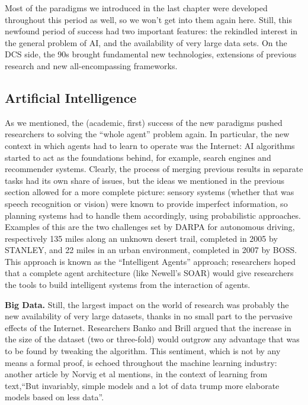 \documentclass[../main.tex]{subfiles}
\begin{document}
Most of the paradigms we introduced in the last chapter were developed throughout this period as well, so we won't get into them again here. Still, this newfound period of success had two important features: the rekindled interest in the general problem of AI, and the availability of very large data sets. On the DCS side, the 90s brought fundamental new technologies, extensions of previous research and new all-encompassing frameworks.

\subsection{Artificial Intelligence}
As we mentioned, the (academic, first) success of the new paradigms pushed researchers to solving the ``whole agent'' problem again. In particular, the new context in which agents had to learn to operate was the Internet: AI algorithms started to act as the foundations behind, for example, search engines and recommender systems. Clearly, the process of merging previous results in separate tasks had its own share of issues, but the ideas we mentioned in the previous section allowed for a more complete picture: sensory systems (whether that was speech recognition or vision) were known to provide imperfect information, so planning systems had to handle them accordingly, using probabilistic approaches. Examples of this are the two challenges set by DARPA for autonomous driving, respectively 135 miles along an unknown desert trail, completed in 2005 by STANLEY, and 22 miles in an urban environment, completed in 2007 by BOSS. This approach is known as the ``Intelligent Agents'' approach; researchers hoped that a complete agent architecture (like Newell's SOAR\cite{pressSoarCognitiveArchitecture2012}) would give researchers the tools to build intelligent systems from the interaction of agents.

\vspace{4pt}
\textbf{Big Data.} Still, the largest impact on the world of research was probably the new availability of very large datasets, thanks in no small part to the pervasive effects of the Internet. Researchers Banko and Brill\cite{bankoScalingVeryVery2001} argued that the increase in the size of the dataset (two or three-fold) would outgrow any advantage that was to be found by tweaking the algorithm. This sentiment, which is not by any means a formal proof, is echoed throughout the machine learning industry: another article by Norvig et al mentions, in the context of learning from text,\enquote{But invariably, simple models and a lot of data trump more elaborate models based on less data}\cite{halevyUnreasonableEffectivenessData2009}.
\end{document}
